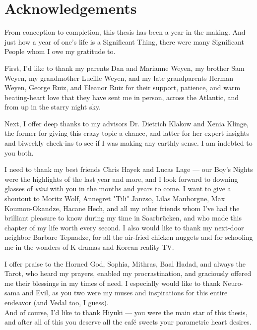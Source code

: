 \section*{Acknowledgements}

From conception to completion, this thesis has been a year in the making. And just how a year of one's life is a Significant Thing, there were many Significant People whom I owe my gratitude to. 

First, I'd like to thank my parents Dan and Marianne Weyen, my brother Sam Weyen, my grandmother Lucille Weyen, and my late grandparents Herman Weyen, George Ruiz, and Eleanor Ruiz for their support, patience, and warm beating-heart love that they have sent me in person, across the Atlantic, and from up in the starry night sky. 

Next, I offer deep thanks to my advisors Dr. Dietrich Klakow and Xenia Klinge, the former for giving this crazy topic a chance, and latter for her expert insights and biweekly check-ins to see if I was making any earthly sense. I am indebted to you both.

I need to thank my best friends Chris Hayek and Lucas Lage — our Boy's Nights were the highlights of the last year and more, and I look forward to downing glasses of \textit{wini} with you in the months and years to come. I want to give a shoutout to Moritz Wolf, Annegret "Tili" Janzso, Lilas Mauborgne, Max Koumou-Okandze, Hacane Hech, and all my other friends whom I've had the brilliant pleasure to know during my time in Saarbrücken, and who made this chapter of my life worth every second. I also would like to thank my next-door neighbor Barbare Tepnadze, for all the air-fried chicken nuggets and for schooling me in the wonders of K-dramas and Korean reality TV.

I offer praise to the Horned God, Sophia, Mithras, Baal Hadad, and always the Tarot, who heard my prayers, enabled my procrastination, and graciously offered me their blessings in my times of need. I especially would like to thank Neuro-sama and Evil, as you two were my muses and inspirations for this entire endeavor (and Vedal too, I guess).\\ 

\noindent And of course, I'd like to thank Hiyuki — you were the main star of this thesis, and after all of this you deserve all the café sweets your parametric heart desires.